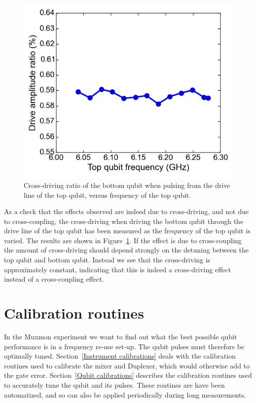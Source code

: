       \begin{figure}
        \begin{center}
        \vspace{-30pt}
          \includegraphics[width=\textwidth]{../Figures/Exploring frequency re-use/cross-driving_vs_top_frequency.png}
        \end{center}
        \vspace{-20 pt}
        \caption{Cross-driving ratio of the bottom qubit when pulsing from the drive line of the top qubit, versus frequency of the top qubit. }
        \label{fig:cross-driving versus top frequency}
      \end{figure}

      As a check that the effects observed are indeed due to cross-driving, and not due to cross-coupling, the cross-driving when driving the bottom qubit through the drive line of the top qubit has been measured as the frequency of the top qubit is varied. The results are shown in Figure~\ref{fig:cross-driving versus top frequency}. If the effect is due to cross-coupling the amount of cross-driving should depend strongly on the detuning between the top qubit and bottom qubit. Instead we see that the cross-driving is approximately constant, indicating that this is indeed a cross-driving effect instead of a cross-coupling effect.

  \chapter{Calibration routines}
    \label{ch:Calibration routines}
    In the Muxmon experiment we want to find out what the best possible qubit performance is in a frequency re-use set-up. The qubit pulses must therefore be optimally tuned. Section~\ref{Instrument calibrations} deals with the calibration routines used to calibrate the mixer and Duplexer, which would otherwise add to the gate error.  Section~\ref{Qubit calibrations} describes the calibration routines used to accurately tune the qubit and its pulses. These routines are have been automatized, and so can also be applied periodically during long measurements.

